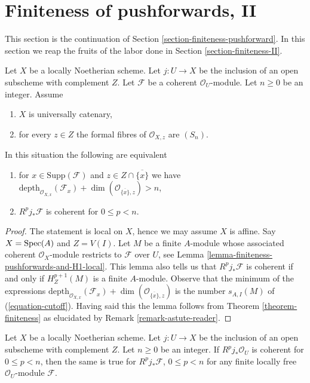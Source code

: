 \section{Finiteness of pushforwards, II}
\label{section-finiteness-pushforward-II}

\noindent
This section is the continuation of
Section \ref{section-finiteness-pushforward}.
In this section we reap the fruits of the labor done in
Section \ref{section-finiteness-II}.

\begin{lemma}
\label{lemma-finiteness-Rjstar}
Let $X$ be a locally Noetherian scheme. Let $j : U \to X$ be the inclusion
of an open subscheme with complement $Z$. Let $\mathcal{F}$ be a coherent
$\mathcal{O}_U$-module. Let $n \geq 0$ be an integer. Assume
\begin{enumerate}
\item $X$ is universally catenary,
\item for every $z \in Z$ the formal fibres of
$\mathcal{O}_{X, z}$ are $(S_n)$.
\end{enumerate}
In this situation the following are equivalent
\begin{enumerate}
\item[(a)] for $x \in \text{Supp}(\mathcal{F})$ and
$z \in Z \cap \overline{\{x\}}$ we have
$\text{depth}_{\mathcal{O}_{X, x}}(\mathcal{F}_x) +
\dim(\mathcal{O}_{\overline{\{x\}}, z}) > n$,
\item[(b)] $R^pj_*\mathcal{F}$ is coherent for $0 \leq p < n$.
\end{enumerate}
\end{lemma}

\begin{proof}
The statement is local on $X$, hence we may assume $X$ is affine.
Say $X = \mathop{\mathrm{Spec}}(A)$ and $Z = V(I)$. Let $M$ be a finite $A$-module
whose associated coherent $\mathcal{O}_X$-module restricts
to $\mathcal{F}$ over $U$, see
Lemma \ref{lemma-finiteness-pushforwards-and-H1-local}.
This lemma also tells us that $R^pj_*\mathcal{F}$ is coherent
if and only if $H^{p + 1}_Z(M)$ is a finite $A$-module.
Observe that the minimum of the expressions
$\text{depth}_{\mathcal{O}_{X, x}}(\mathcal{F}_x) +
\dim(\mathcal{O}_{\overline{\{x\}}, z})$
is the number $s_{A, I}(M)$ of (\ref{equation-cutoff}).
Having said this the lemma follows from
Theorem \ref{theorem-finiteness}
as elucidated by Remark \ref{remark-astute-reader}.
\end{proof}

\begin{lemma}
\label{lemma-finiteness-for-finite-locally-free}
Let $X$ be a locally Noetherian scheme. Let $j : U \to X$ be the inclusion
of an open subscheme with complement $Z$. Let $n \geq 0$ be an integer.
If $R^pj_*\mathcal{O}_U$ is coherent for $0 \leq p < n$, then
the same is true for $R^pj_*\mathcal{F}$, $0 \leq p < n$
for any finite locally free $\mathcal{O}_U$-module $\mathcal{F}$.
\end{lemma}

